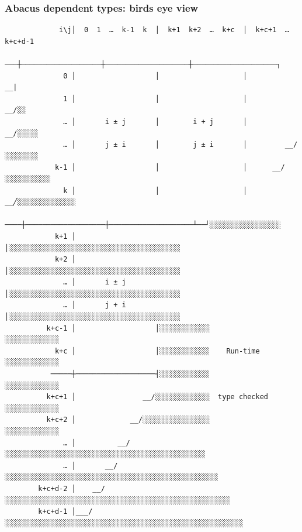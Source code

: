 \documentclass{beamer}
\begin{document}
    \begin{frame}[fragile]
        \frametitle{Abacus dependent types: birds eye view}
        \begin{tiny}
        \begin{verbatim}
             i\j│  0  1  …  k-1  k  │  k+1  k+2  …  k+c  │  k+c+1  …  k+c+d-1
             ───┼───────────────────┼────────────────────┼────────────────────┐
              0 │                   │                    │                  __|
              1 │                   │                    │               __/░░
              … │       i ± j       │        i + j       │            __/░░░░░
              … │       j ± i       │        j ± i       │         __/░░░░░░░░
            k-1 │                   │                    │      __/░░░░░░░░░░░
              k │                   │                    │   __╱░░░░░░░░░░░░░░
            ────┼───────────────────┼────────────────────┴──┘░░░░░░░░░░░░░░░░░
            k+1 │                   │░░░░░░░░░░░░░░░░░░░░░░░░░░░░░░░░░░░░░░░░░
            k+2 │                   │░░░░░░░░░░░░░░░░░░░░░░░░░░░░░░░░░░░░░░░░░
              … │       i ± j       │░░░░░░░░░░░░░░░░░░░░░░░░░░░░░░░░░░░░░░░░░
              … │       j + i       │░░░░░░░░░░░░░░░░░░░░░░░░░░░░░░░░░░░░░░░░░
          k+c-1 │                   │░░░░░░░░░░░░                ░░░░░░░░░░░░░
            k+c │                   │░░░░░░░░░░░░    Run-time    ░░░░░░░░░░░░░
           ─────┼───────────────────┤░░░░░░░░░░░░                ░░░░░░░░░░░░░
          k+c+1 │                __/░░░░░░░░░░░░░  type checked  ░░░░░░░░░░░░░
          k+c+2 │             __/░░░░░░░░░░░░░░░░                ░░░░░░░░░░░░░
              … │          __/░░░░░░░░░░░░░░░░░░░░░░░░░░░░░░░░░░░░░░░░░░░░░░░░
              … │       __/░░░░░░░░░░░░░░░░░░░░░░░░░░░░░░░░░░░░░░░░░░░░░░░░░░░
        k+c+d-2 │    __/░░░░░░░░░░░░░░░░░░░░░░░░░░░░░░░░░░░░░░░░░░░░░░░░░░░░░░
        k+c+d-1 │___/░░░░░░░░░░░░░░░░░░░░░░░░░░░░░░░░░░░░░░░░░░░░░░░░░░░░░░░░░
        \end{verbatim}
        \end{tiny}
    \end{frame}
\end{document}

